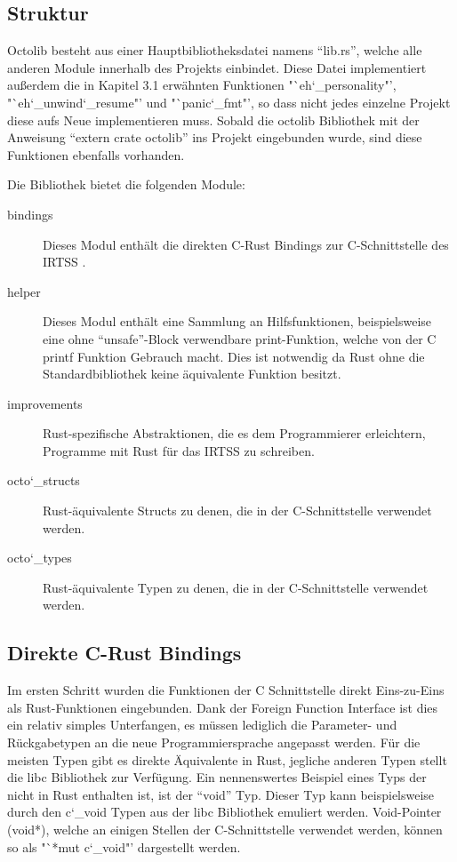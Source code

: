 \subsection{Struktur}

Octolib besteht aus einer Hauptbibliotheksdatei namens "`lib.rs"', welche alle anderen Module innerhalb des Projekts einbindet. Diese
Datei implementiert außerdem die in Kapitel 3.1 erwähnten Funktionen "`eh\char`_personality"', "`eh\char`_unwind\char`_resume"' und
"`panic\char`_fmt"', so dass nicht jedes einzelne Projekt diese aufs Neue implementieren muss. Sobald die octolib Bibliothek
mit der Anweisung "`extern crate octolib"' ins Projekt eingebunden wurde, sind diese Funktionen ebenfalls vorhanden.

Die Bibliothek bietet die folgenden Module:

\begin{description}

	\item[bindings] 
	Dieses Modul enthält die direkten C-Rust Bindings zur C-Schnittstelle des IRTSS	.
	
	\item[helper]
	Dieses Modul enthält eine Sammlung an Hilfsfunktionen, beispielsweise eine ohne "`unsafe"'-Block verwendbare
	print-Funktion, welche von der C printf Funktion Gebrauch macht. Dies ist notwendig da Rust ohne die Standardbibliothek
	keine äquivalente Funktion besitzt.
	
	\item[improvements]
	Rust-spezifische Abstraktionen, die es dem Programmierer erleichtern, Programme mit Rust für das IRTSS zu schreiben.
	
	\item[octo\char`_structs]
	Rust-äquivalente Structs zu denen, die in der C-Schnittstelle verwendet werden.
	
	\item[octo\char`_types]
	Rust-äquivalente Typen zu denen, die in der C-Schnittstelle verwendet werden.

\end{description}

\subsection{Direkte C-Rust Bindings}

Im ersten Schritt wurden die Funktionen der C Schnittstelle direkt Eins-zu-Eins als Rust-Funktionen eingebunden. Dank der
Foreign Function Interface ist dies ein relativ simples Unterfangen, es müssen lediglich die Parameter- und Rückgabetypen
an die neue Programmiersprache angepasst werden. Für die meisten Typen gibt es direkte Äquivalente in Rust, jegliche anderen Typen
stellt die libc Bibliothek zur Verfügung. Ein nennenswertes Beispiel eines Typs der nicht in Rust enthalten ist, ist der
"`void"' Typ. Dieser Typ kann beispielsweise durch den c\char`_void Typen aus der libc Bibliothek emuliert werden.
Void-Pointer (void*), welche an einigen Stellen der C-Schnittstelle verwendet werden, können so als "`*mut c\char`_void"'
dargestellt werden.

